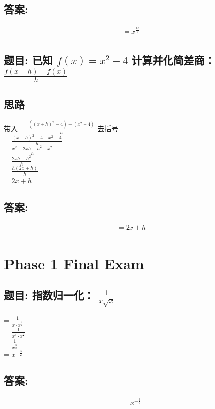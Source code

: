 \documentclass[12pt]{article}
\begin{document}
\subsection*{答案:}
\begin{align*}
  &= x^{\frac{13}{6}} \\
\end{align*}

\subsection*{题目: 已知 $f(x) = x^{2}-4 $ 计算并化简差商： 
$\frac{f(x+h) - f(x)}{h}$}
\subsection*{思路} 
带入
= $\frac{((x+h)^2-4)-(x^2 -4)}{h}$ 去括号 \\
= $\frac{(x+h)^2-4-x^2 +4}{h}$\\
= $\frac{x^{2} + 2xh + h^{2} - x^{2}}{h}$\\
= $\frac{2xh + h^{2}}{h}$\\
= $\frac{h(2x + h)}{h}$\\
= $2x +h $\\
\subsection*{答案:}
\begin{align*}
  &= 2x +h \\
\end{align*}

\section{Phase 1 Final Exam}
\subsection*{题目: 指数归一化： $\frac{1}{x\sqrt{x}}$}
= $\frac{1}{x \cdot x^{\frac{1}{2}}}$\\
= $\frac{1}{x^{1} \cdot x^{\frac{1}{2}}}$\\
= $\frac{1}{x^{\frac{3}{2}}}$\\
= $x^{-\frac{3}{2}}$\\
\subsection*{答案:}
\begin{align*}
  &= x^{-\frac{3}{2}} \\
\end{align*}
\end{document}
